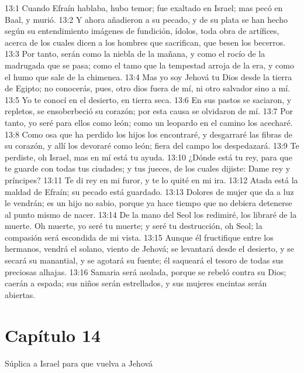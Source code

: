 												13:1 Cuando Efraín hablaba, hubo temor; fue exaltado en Israel; mas pecó en Baal, y murió. 
												13:2 Y ahora añadieron a su pecado, y de su plata se han hecho según su entendimiento imágenes de fundición, ídolos, toda obra de artífices, acerca de los cuales dicen a los hombres que sacrifican, que besen los becerros. 
												13:3 Por tanto, serán como la niebla de la mañana, y como el rocío de la madrugada que se pasa; como el tamo que la tempestad arroja de la era, y como el humo que sale de la chimenea. 
												13:4 Mas yo soy Jehová tu Dios desde la tierra de Egipto; no conocerás, pues, otro dios fuera de mí, ni otro salvador sino a mí. 
												13:5 Yo te conocí en el desierto, en tierra seca. 
												13:6 En sus pastos se saciaron, y repletos, se ensoberbeció su corazón; por esta causa se olvidaron de mí. 
												13:7 Por tanto, yo seré para ellos como león; como un leopardo en el camino los acecharé. 
												13:8 Como osa que ha perdido los hijos los encontraré, y desgarraré las fibras de su corazón, y allí los devoraré como león; fiera del campo los despedazará. 
												13:9 Te perdiste, oh Israel, mas en mí está tu ayuda. 
												13:10 ¿Dónde está tu rey, para que te guarde con todas tus ciudades; y tus jueces, de los cuales dijiste: Dame rey y príncipes? 
												13:11 Te di rey en mi furor, y te lo quité en mi ira. 
												13:12 Atada está la maldad de Efraín; su pecado está guardado. 
												13:13 Dolores de mujer que da a luz le vendrán; es un hijo no sabio, porque ya hace tiempo que no debiera detenerse al punto mismo de nacer. 
												13:14 De la mano del Seol los redimiré, los libraré de la muerte. Oh muerte, yo seré tu muerte; y seré tu destrucción, oh Seol; la compasión será escondida de mi vista. 
												13:15 Aunque él fructifique entre los hermanos, vendrá el solano, viento de Jehová; se levantará desde el desierto, y se secará su manantial, y se agotará su fuente; él saqueará el tesoro de todas sus preciosas alhajas. 
												13:16 Samaria será asolada, porque se rebeló contra su Dios; caerán a espada; sus niños serán estrellados, y sus mujeres encintas serán abiertas. 
												\section*{Capítulo 14 }
													Súplica a Israel para que vuelva a Jehová 
													
